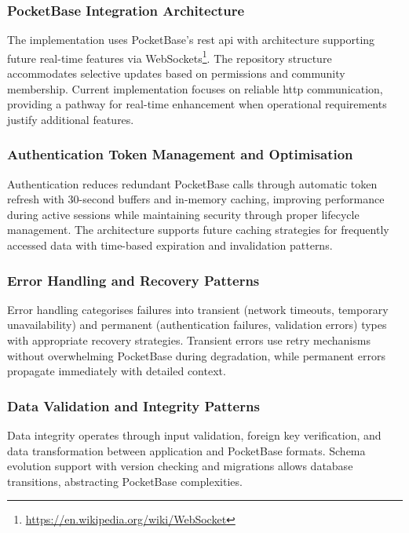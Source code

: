\subsubsection{PocketBase Integration Architecture}

The implementation uses PocketBase's \ac{rest} \ac{api} with architecture supporting future real-time features via WebSockets\footnote{\url{https://en.wikipedia.org/wiki/WebSocket}}. The repository structure accommodates selective updates based on permissions and community membership. Current implementation focuses on reliable \ac{http} communication, providing a pathway for real-time enhancement when operational requirements justify additional features.

\subsubsection{Authentication Token Management and Optimisation}

Authentication reduces redundant PocketBase calls through automatic token refresh with 30-second buffers and in-memory caching, improving performance during active sessions while maintaining security through proper lifecycle management. The architecture supports future caching strategies for frequently accessed data with time-based expiration and invalidation patterns.

\subsubsection{Error Handling and Recovery Patterns}

Error handling categorises failures into transient (network timeouts, temporary unavailability) and permanent (authentication failures, validation errors) types with appropriate recovery strategies. Transient errors use retry mechanisms without overwhelming PocketBase during degradation, while permanent errors propagate immediately with detailed context.

\subsubsection{Data Validation and Integrity Patterns}

Data integrity operates through input validation, foreign key verification, and data transformation between application and PocketBase formats. Schema evolution support with version checking and migrations allows database transitions, abstracting PocketBase complexities.

